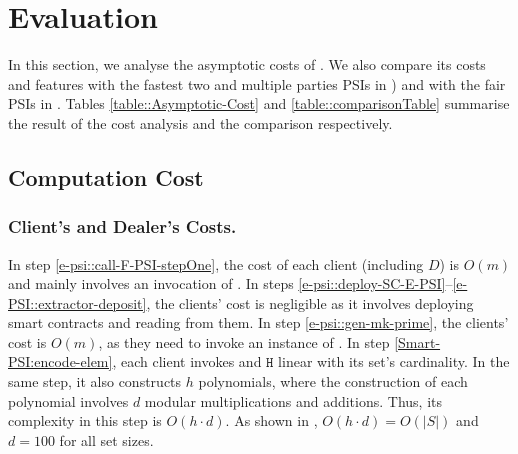 

\vspace{-4mm}

\section{Evaluation}\label{sec::valuation}

\vspace{-3mm}

In this section, we analyse the asymptotic costs of \epsi. We also compare its costs and features with the fastest two and multiple parties PSIs in \cite{AbadiDMT22,DBLP:conf/ccs/KolesnikovMPRT17,NevoTY21,RaghuramanR22}) and with the fair PSIs in \cite{DebnathD16,DBLP:conf/dbsec/DongCCR13}. Tables \ref{table::Asymptotic-Cost} and \ref{table::comparisonTable} summarise the result of the cost analysis and the comparison respectively. 

\vspace{-6mm}


\vspace{-4.5mm}


\vspace{-5.5mm}
\subsection{Computation Cost}

\vspace{-1mm}
\subsubsection{Client's and Dealer's Costs.}

In step \ref{e-psi::call-F-PSI-stepOne}, the cost of each client (including $D$) is $O(m)$ and mainly involves an invocation of \ct. 
% 
In steps \ref{e-psi::deploy-SC-E-PSI}--\ref{e-PSI::extractor-deposit}, the clients' cost is negligible as it involves deploying smart contracts and reading from them. 
%
In step \ref{e-psi::gen-mk-prime}, the clients' cost is  $O(m)$, as they need to invoke an instance of \ct. 
%
In step \ref{Smart-PSI:encode-elem}, each client invokes \prp and $\mathtt{H}$ linear with its set's cardinality. In the same step, it also constructs $h$ polynomials, where the construction of each polynomial involves $d$  modular multiplications and additions. Thus, its complexity in this step is $O(h\cdot d)$. As shown in \cite{AbadiDMT22},  $O(h\cdot d)=O(|S|)$ and  $d=100$ for all set sizes. 
%


